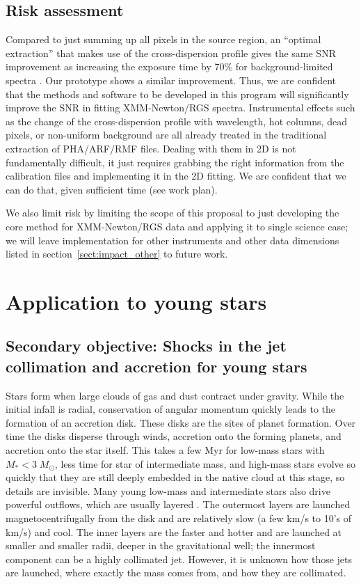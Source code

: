 \documentclass[fleqn,12pt,onecolumn]{SelfArx} %
\begin{document}
\subsection{Risk assessment}

Compared to just summing up all pixels in the source region, an ``optimal extraction'' that makes use of the cross-dispersion profile gives the same SNR improvement as increasing the exposure time by 70\% for background-limited spectra \cite{1986PASP...98..609H}. Our prototype shows a similar improvement. Thus, we are confident that the methods and software to be developed in this program will significantly improve the SNR in fitting XMM-Newton/RGS spectra. Instrumental effects such as the change of the cross-dispersion profile with wavelength, hot columns, dead pixels, or non-uniform background are all already treated in the traditional extraction of PHA/ARF/RMF files. Dealing with them in 2D is not fundamentally difficult, it just requires grabbing the right information from the calibration files and implementing it in the 2D fitting. We are confident that we can do that, given sufficient time (see work plan).

We also limit risk by limiting the scope of this proposal to just developing the core method for XMM-Newton/RGS data and applying it to single science case; we will leave implementation for other instruments and other data dimensions listed in section~\ref{sect:impact_other} to future work.

\section{Application to young stars}
\label{sect:application}
\subsection{Secondary objective: Shocks in the jet collimation and accretion for young stars}
Stars form when large clouds of gas and dust contract under gravity. While the initial infall is radial, conservation of angular momentum quickly leads to the formation of an accretion disk. These disks are the sites of planet formation. Over time the disks disperse through winds, accretion onto the forming planets, and accretion onto the star itself. This takes a few Myr for low-mass stars with $M_* < 3\; M_\odot$, less time for star of intermediate mass, and high-mass stars evolve so quickly that they are still deeply embedded in the native cloud at this stage, so details are invisible. Many young low-mass and intermediate stars also drive powerful outflows, which are usually layered \cite{2000ApJ...537L..49B}. The outermost layers are launched magnetocentrifugally from the disk and are relatively slow (a few km/s to 10's of km/s) and cool. The inner layers are the faster and hotter and are launched at smaller and smaller radii, deeper in the gravitational well; the innermost component can be a highly collimated jet. However, it is unknown how those jets are launched, where exactly the mass comes from, and how they are collimated.
\end{document}

